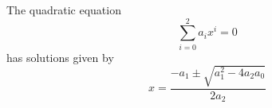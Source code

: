 \documentclass{scrartcl}
\begin{document}
The quadratic equation
\[
\sum_{i=0}^{2} a_i x^i = 0
\]
has solutions given by
\[
x = \frac{-a_1 \pm \sqrt{a_1^2 - 4 a_2 a_0}}{2a_2}
\]
\end{document}
